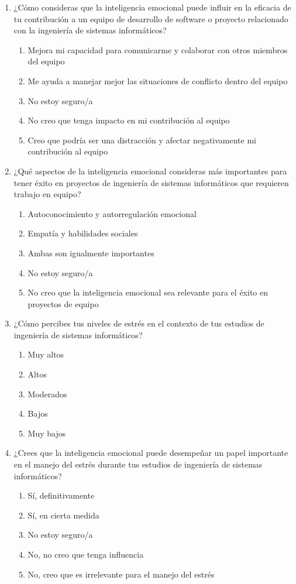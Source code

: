 \documentclass[journal]{IEEEtran}
\begin{document}
\begin{enumerate}
	\item ¿Cómo consideras que la inteligencia emocional puede influir en la eficacia de tu contribución a un equipo de desarrollo de software o proyecto relacionado con la ingeniería de sistemas informáticos?
	\begin{enumerate}
		\item Mejora mi capacidad para comunicarme y colaborar con otros miembros del equipo
		\item Me ayuda a manejar mejor las situaciones de conflicto dentro del equipo
		\item No estoy seguro/a
		\item No creo que tenga impacto en mi contribución al equipo
		\item Creo que podría ser una distracción y afectar negativamente mi contribución al equipo
	\end{enumerate}
	
	\item ¿Qué aspectos de la inteligencia emocional consideras más importantes para tener éxito en proyectos de ingeniería de sistemas informáticos que requieren trabajo en equipo?
	\begin{enumerate}
		\item Autoconocimiento y autorregulación emocional
		\item Empatía y habilidades sociales
		\item Ambas son igualmente importantes
		\item No estoy seguro/a
		\item No creo que la inteligencia emocional sea relevante para el éxito en proyectos de equipo
	\end{enumerate}
	
	\item ¿Cómo percibes tus niveles de estrés en el contexto de tus estudios de ingeniería de sistemas informáticos?
	\begin{enumerate}
		\item Muy altos
		\item Altos
		\item Moderados
		\item Bajos
		\item Muy bajos
	\end{enumerate}
	
	\item ¿Crees que la inteligencia emocional puede desempeñar un papel importante en el manejo del estrés durante tus estudios de ingeniería de sistemas informáticos?
	\begin{enumerate}
		\item Sí, definitivamente
		\item Sí, en cierta medida
		\item No estoy seguro/a
		\item No, no creo que tenga influencia
		\item No, creo que es irrelevante para el manejo del estrés
	\end{enumerate}
	

\end{enumerate}
\end{document}
